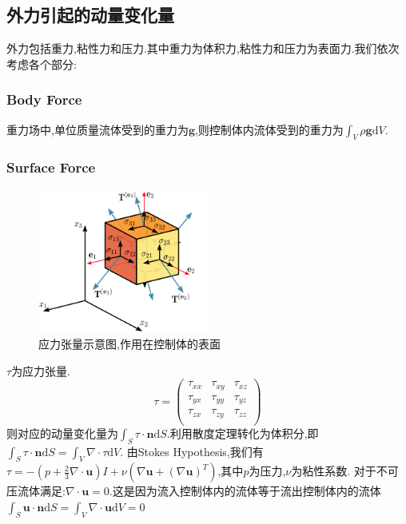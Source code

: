 \documentclass[12pt,halfline,a4paper]{ouparticle}
\begin{document}
\subsection*{外力引起的动量变化量}
外力包括重力,粘性力和压力.其中重力为体积力,粘性力和压力为表面力.我们依次考虑各个部分:
\subsubsection*{Body Force}
重力场中,单位质量流体受到的重力为$\mathbf{g}$,则控制体内流体受到的重力为$\int_V \rho \mathbf{g} \text{d} V$.
\subsubsection*{Surface Force}
\begin{figure}[h] %
    \centering
    \includegraphics[width=0.5\textwidth]{figure/stress_tensor.png}
    \caption{应力张量示意图,作用在控制体的表面}  
    \label{fig:stress_tensor}  
\end{figure}
$\tau$为应力张量.
$$\tau = \begin{pmatrix}
\tau_{xx} & \tau_{xy} & \tau_{xz} \\
\tau_{yx} & \tau_{yy} & \tau_{yz} \\
\tau_{zx} & \tau_{zy} & \tau_{zz} \\
\end{pmatrix}$$
则对应的动量变化量为$\int_{S} \tau \cdot \mathbf{n} \text{d} S$.利用散度定理转化为体积分,即$\int_{S} \tau \cdot \mathbf{n} \text{d} S = \int_{V} \nabla \cdot \tau \text{d} V$.
\newline
由Stokes Hypothesis,我们有$\tau = -(p + \frac{2}{3}\nabla \cdot \boldsymbol{u} )I + \nu (\nabla \boldsymbol{u} + (\nabla \boldsymbol{u})^T)$,其中$p$为压力,$\nu$为粘性系数.
\newline
对于不可压流体满足:$\nabla \cdot \boldsymbol{u} = 0$.这是因为流入控制体内的流体等于流出控制体内的流体$\int_S \boldsymbol{u}\cdot \mathbf{n} \text{d} S = \int_V \nabla \cdot \boldsymbol{u} \text{d}V = 0$
\end{document}
